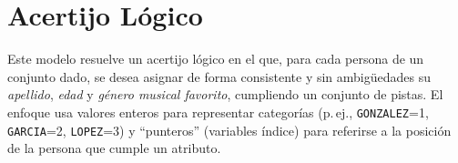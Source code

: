 
\section{Acertijo Lógico}\label{sec:04-acertijo-logico}
Este modelo resuelve un acertijo lógico en el que, para cada persona de un conjunto dado, se desea asignar de forma consistente y sin ambigüedades su \emph{apellido}, \emph{edad} y \emph{género musical favorito}, cumpliendo un conjunto de pistas. El enfoque usa valores enteros para representar categorías (p.\,ej., \texttt{GONZALEZ}=1, \texttt{GARCIA}=2, \texttt{LOPEZ}=3) y “punteros” (variables índice) para referirse a la posición de la persona que cumple un atributo.
